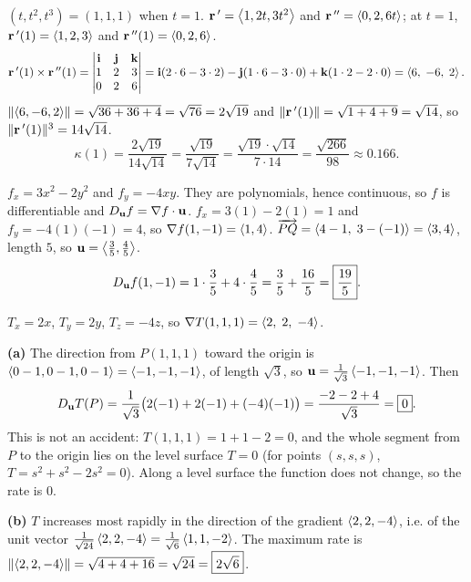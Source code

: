  $(t,t^2,t^3)=(1,1,1)$ when $t=1$.
 $\mathbf{r}\,'=\left\langle 1,2t,3t^2 \right\rangle$ and $\mathbf{r}\,''=\left\langle 0,2,6t \right\rangle$; at $t=1$,
$\mathbf{r}\,'(1)=\left\langle 1,2,3 \right\rangle$ and $\mathbf{r}\,''(1)=\left\langle 0,2,6 \right\rangle$.
\[
  \mathbf{r}\,'(1)\times\mathbf{r}\,''(1)=\begin{vmatrix}\mathbf{i}&\mathbf{j}&\mathbf{k}\\1&2&3\\0&2&6\end{vmatrix}
  =\mathbf{i}(2\cdot6-3\cdot2)-\mathbf{j}(1\cdot6-3\cdot0)+\mathbf{k}(1\cdot2-2\cdot0)=\left\langle 6,\;-6,\;2 \right\rangle.
\]
 $\lVert\left\langle 6,-6,2 \right\rangle\rVert=\sqrt{36+36+4}=\sqrt{76}=2\sqrt{19}$ and
$\lVert\mathbf{r}\,'(1)\rVert=\sqrt{1+4+9}=\sqrt{14}$, so $\lVert\mathbf{r}\,'(1)\rVert^3=14\sqrt{14}$.
\[
  \kappa(1)=\frac{2\sqrt{19}}{14\sqrt{14}}=\frac{\sqrt{19}}{7\sqrt{14}}
  =\frac{\sqrt{19}\cdot\sqrt{14}}{7\cdot14}=\boxed{\frac{\sqrt{266}}{98}}\approx0.166 .
\]

 $f_x=3x^2-2y^2$ and $f_y=-4xy$. They are polynomials, hence
continuous, so $f$ is differentiable and $D_{\mathbf{u}} f=\nabla f\cdot\mathbf{u}$.
 $f_x=3(1)-2(1)=1$ and $f_y=-4(1)(-1)=4$, so $\nabla f(1,-1)=\left\langle 1,4 \right\rangle$.
 $\overrightarrow{PQ}=\left\langle 4-1,\;3-(-1) \right\rangle=\left\langle 3,4 \right\rangle$, length $5$, so $\mathbf{u}=\left\langle \frac35,\frac45 \right\rangle$.
\[
  D_{\mathbf{u}} f(1,-1)=1\cdot\frac35+4\cdot\frac45=\frac35+\frac{16}{5}=\boxed{\frac{19}{5}}.
\]

 $T_x=2x$, $T_y=2y$, $T_z=-4z$, so $\nabla T(1,1,1)=\left\langle 2,\;2,\;-4 \right\rangle$.

\textbf{(a)} The direction from $P(1,1,1)$ toward the origin is $\left\langle 0-1,0-1,0-1 \right\rangle=\left\langle -1,-1,-1 \right\rangle$,
of length $\sqrt3$, so $\mathbf{u}=\frac{1}{\sqrt3}\left\langle -1,-1,-1 \right\rangle$. Then
\[
  D_{\mathbf{u}} T(P)=\frac{1}{\sqrt3}\big(2(-1)+2(-1)+(-4)(-1)\big)=\frac{-2-2+4}{\sqrt3}=\boxed{0}.
\]
This is not an accident: $T(1,1,1)=1+1-2=0$, and the whole segment from $P$ to the
origin lies on the level surface $T=0$ (for points $(s,s,s)$, $T=s^2+s^2-2s^2=0$). Along a level
surface the function does not change, so the rate is $0$.

\textbf{(b)} $T$ increases most rapidly in the direction of the gradient $\left\langle 2,2,-4 \right\rangle$, i.e. of
the unit vector $\frac{1}{\sqrt{24}}\left\langle 2,2,-4 \right\rangle=\frac{1}{\sqrt6}\left\langle 1,1,-2 \right\rangle$. The maximum rate is
$\lVert\left\langle 2,2,-4 \right\rangle\rVert=\sqrt{4+4+16}=\sqrt{24}=\boxed{2\sqrt6}$.

